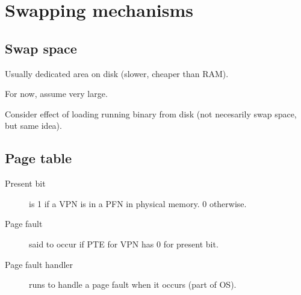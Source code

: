 \chapter{Swapping mechanisms}
\label{ch:swapping-mechanisms}




\section{Swap space}

Usually dedicated area on disk (slower, cheaper than RAM).

For now, assume very large.

Consider effect of loading running binary from disk (not necesarily swap space, but same idea).

\section{Page table}

\begin{description}
\item[Present bit] is 1 if a VPN is in a PFN in physical memory. 0 otherwise.
\item[Page fault] said to occur if PTE for VPN has 0 for present bit.
\item[Page fault handler] runs to handle a page fault when it occurs (part of OS).
\end{description}

